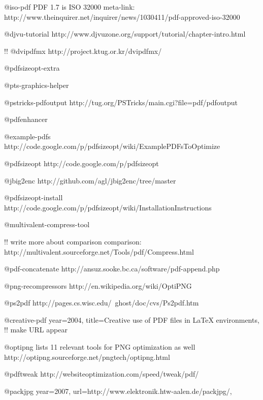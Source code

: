 \documentclass{ltugproc}
\begin{document}
@iso-pdf{
PDF 1.7 is ISO 32000
meta-link: http://www.theinquirer.net/inquirer/news/1030411/pdf-approved-iso-32000
}

@djvu-tutorial{
http://www.djvuzone.org/support/tutorial/chapter-intro.html
}

!!
@dvipdfmx{
http://project.ktug.or.kr/dvipdfmx/
}

@pdfsizeopt-extra{
}

@pts-graphics-helper{
}

@pstricks-pdfoutput{
http://tug.org/PSTricks/main.cgi?file=pdf/pdfoutput
}

@pdfenhancer{
}

@example-pdfs{
http://code.google.com/p/pdfsizeopt/wiki/ExamplePDFsToOptimize
}

@pdfsizeopt{
http://code.google.com/p/pdfsizeopt
}

@jbig2enc{
http://github.com/agl/jbig2enc/tree/master
}

@pdfsizeopt-install{
http://code.google.com/p/pdfsizeopt/wiki/InstallationInstructions
}

@multivalent-compress-tool{
!! write more about comparison
comparison: http://multivalent.sourceforge.net/Tools/pdf/Compress.html

}

@pdf-concatenate{
http://ansuz.sooke.bc.ca/software/pdf-append.php
}

@png-recompressors{
http://en.wikipedia.org/wiki/OptiPNG
}

@ps2pdf{
http://pages.cs.wisc.edu/~ghost/doc/cvs/Ps2pdf.htm
}

@creative-pdf{
  year=2004,
  title={Creative use of PDF files in {\LaTeX} environments},
  !! make URL appear
}

@optipng{
  lists 11 relevant tools for PNG optimization as well
  http://optipng.sourceforge.net/pngtech/optipng.html
}

@pdftweak{
  http://websiteoptimization.com/speed/tweak/pdf/
}

@packjpg{
  year=2007,
  url={http://www.elektronik.htw-aalen.de/packjpg/},
}
\end{document}
